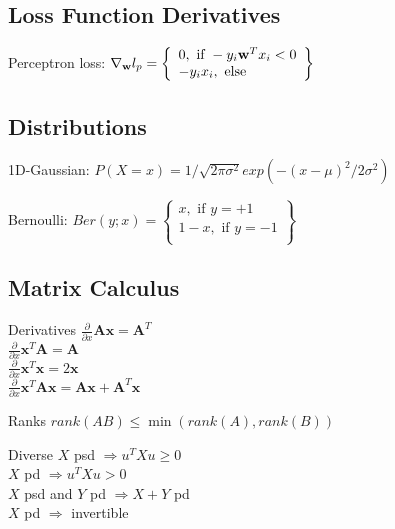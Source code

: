\documentclass[a4paper, 11pt, landscape]{article}
\begin{document}
\begin{multicols*}{3}
		\subsection{Loss Function Derivatives}
		\begin{compactdesc}
			\item[Perceptron loss:] $\nabla_\mathbf{w} l_p = \left\{
			\begin{array}{lr}
			0, \text{ if } -y_i \mathbf{w}^T x_i < 0\\
			-y_ix_i, \text{ else}\\
			\end{array}\right\}\\$
		\end{compactdesc}
		\subsection{Distributions}
		\begin{compactdesc}
			\item[1D-Gaussian:] $P(X = x) = 1/\sqrt{2\pi\sigma^2}exp(-(x-\mu)^2/{2\sigma^2})$
			\item[Bernoulli:] $Ber(y; x) = \left\{
				\begin{array}{lr}
				x, \text{ if } y= +1\\
				1-x, \text{ if } y =-1\\
				\end{array}
				\right\}$
		\end{compactdesc}
		\subsection{Matrix Calculus}
		\begin{compactdesc}
			\item[Derivatives]
			$\frac{\partial}{\partial x} \mathbf{A x} = \mathbf{A}^T$\\
			$\frac{\partial}{\partial x} \mathbf{x}^T\mathbf{A} =  \mathbf{A}$\\
			$\frac{\partial}{\partial x} \mathbf{x}^T\mathbf{x} = 2\mathbf{x}$\\
			$\frac{\partial}{\partial x} \mathbf{x}^T\mathbf{A x} = \mathbf{Ax} + \mathbf{A}^T\mathbf{x}$
			\item[Ranks]
			$rank(AB) \leq \min(rank(A), rank(B))$
			\item[Diverse] $X$ psd $\Rightarrow u^TX u \geq 0$\\
			$X$ pd $\Rightarrow u^TX u > 0$\\
			$X$ psd and $Y$ pd $\Rightarrow X+Y$ pd\\
			$X$ pd $\Rightarrow$ invertible


\end{compactdesc}
\end{multicols*}
\end{document}
